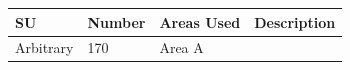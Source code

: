 \documentclass[
  12pt,
]{krantz}
\begin{document}
\begin{longtable}[]{@{}llll@{}}
\toprule
\begin{minipage}[b]{0.18\columnwidth}\raggedright
SU\strut
\end{minipage} & \begin{minipage}[b]{0.11\columnwidth}\raggedright
Number\strut
\end{minipage} & \begin{minipage}[b]{0.16\columnwidth}\raggedright
Areas Used\strut
\end{minipage} & \begin{minipage}[b]{0.38\columnwidth}\raggedright
Description\strut
\end{minipage}\tabularnewline
\midrule
\endhead
\begin{minipage}[t]{0.18\columnwidth}\raggedright
Arbitrary\strut
\end{minipage} & \begin{minipage}[t]{0.11\columnwidth}\raggedright
170\strut
\end{minipage} & \begin{minipage}[t]{0.16\columnwidth}\raggedright
Area A


\end{minipage}
\end{longtable}
\end{document}
